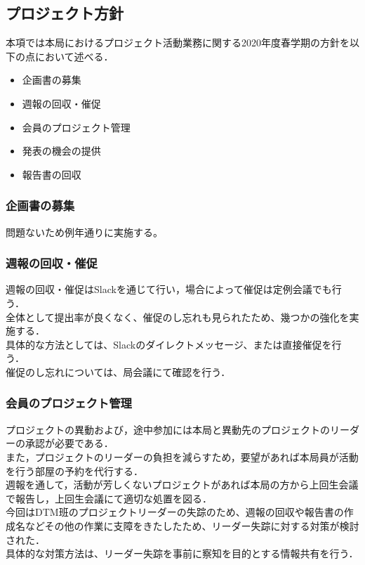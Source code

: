 ﻿\subsection*{プロジェクト方針}


本項では本局におけるプロジェクト活動業務に関する2020年度春学期の方針を以下の点において述べる．

\begin{itemize}
\item 企画書の募集
\item 週報の回収・催促
\item 会員のプロジェクト管理
\item 発表の機会の提供
\item 報告書の回収
\end{itemize}

\subsubsection*{企画書の募集}

問題ないため例年通りに実施する。\\
\subsubsection*{週報の回収・催促}
週報の回収・催促はSlackを通じて行い，場合によって催促は定例会議でも行う．\\全体として提出率が良くなく、催促のし忘れも見られたため、幾つかの強化を実施する．\\具体的な方法としては、Slackのダイレクトメッセージ、または直接催促を行う．\\催促のし忘れについては、局会議にて確認を行う．\\


\subsubsection*{会員のプロジェクト管理}

プロジェクトの異動および，途中参加には本局と異動先のプロジェクトのリーダーの承認が必要である．\\また，プロジェクトのリーダーの負担を減らすため，要望があれば本局員が活動を行う部屋の予約を代行する．\\週報を通して，活動が芳しくないプロジェクトがあれば本局の方から上回生会議で報告し，上回生会議にて適切な処置を図る．\\今回はDTM班のプロジェクトリーダーの失踪のため、週報の回収や報告書の作成名などその他の作業に支障をきたしたため、リーダー失踪に対する対策が検討された．\\具体的な対策方法は、リーダー失踪を事前に察知を目的とする情報共有を行う．\\

